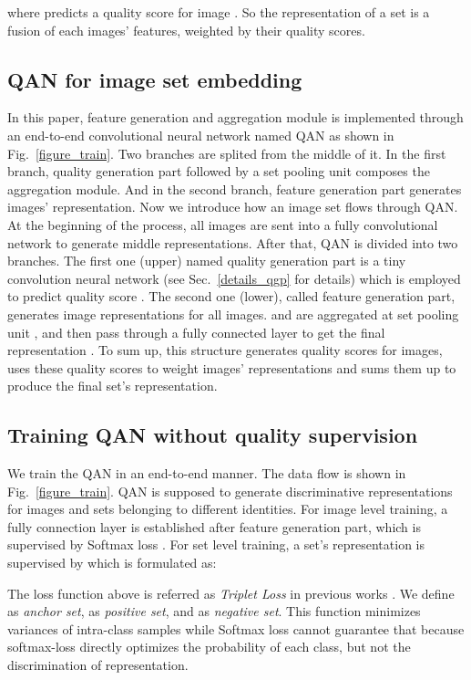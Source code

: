 \documentclass[10pt,twocolumn,letterpaper]{article}
\begin{document}
where  predicts a quality score  for image . So the representation of a set is a fusion of each images' features, weighted by their quality scores.

\subsection{QAN for image set embedding}
In this paper, feature generation and aggregation module is implemented through an end-to-end convolutional neural network named QAN as shown in Fig.~\ref{figure_train}. Two branches are splited from the middle of it. In the first branch, quality generation part followed by a set pooling unit composes the aggregation module. And in the second branch, feature generation part  generates images' representation. Now we introduce how an image set flows through QAN. At the beginning of the process, all images are sent into a fully convolutional network to generate middle representations. After that,
QAN is divided into two branches. The first one (upper) named quality generation part is a tiny convolution neural network (see Sec.~\ref{details_qgp} for details) which is employed to predict quality score . The second one (lower), called feature generation part,  generates image representations  for all images.  and  are aggregated at set pooling unit , and then pass through a fully connected layer to get the final representation . To sum up, this structure generates quality scores for images, uses these quality scores to weight images' representations and sums them up to produce the final set's representation.

\subsection{Training QAN without quality supervision}
\label{end2endtrain}
We train the QAN in an end-to-end manner. The data flow is shown in Fig.~\ref{figure_train}. QAN is supposed to generate discriminative representations for images and sets belonging to different identities. For image level training, a fully connection layer is established after feature generation part, which is supervised by Softmax loss . For set level training, a set's representation  is supervised by  which is formulated as:



The loss function above is referred as \emph{Triplet Loss} in previous works \cite{schroff2015facenet}. We define  as \emph{anchor set},  as \emph{positive set}, and  as \emph{negative set}.  This function minimizes variances of intra-class samples while Softmax loss cannot guarantee that because softmax-loss directly optimizes the probability of each class, but not the discrimination of representation.
\end{document}
